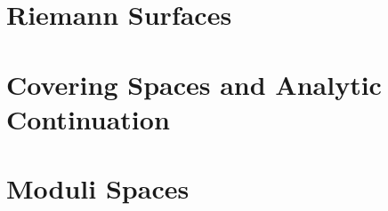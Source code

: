 \documentclass[a4paper, 8pt, notitlepage]{extreport}
\begin{document}
    

    \chapter{Riemann Surfaces}
    
    

    \chapter{Covering Spaces and Analytic Continuation}\label{cpt:covering_spaces_analytic_continuation}
    
    
    

    \chapter{Moduli Spaces}
    
    \printbibliography
\end{document}
